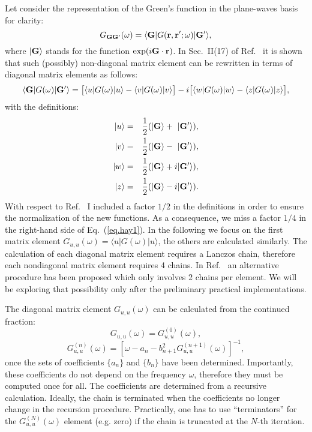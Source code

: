 \documentclass[12pt]{article}
\def\G{{\bf G}}
\def\Gp{{\bf G}^\prime}
\def\r{{\bf r}}
\def\rp{{\bf r}^\prime}
\def\w{\omega}
\begin{document}
\noindent
Let consider the representation of the Green's function in the plane-waves basis
for clarity:
 \begin{equation}
 G_{\G\Gp}(\w) = \langle \G | G(\r,\rp;\w)| \Gp \rangle,
 \end{equation}
where $|\G\rangle$ stands for the function ${\rm exp}(i\G\cdot\r)$.
In Sec.\ II(17) of Ref.\ \cite{haydock.ssp} it is shown that such (possibly) non-diagonal matrix
element can be rewritten in terms of diagonal matrix elements as follows:
 \begin{equation} \label{eq.hay1}
 \langle \G | G(\w)| \Gp \rangle = \big[\langle u | G(\w)| u \rangle - \langle v | G(\w)| v \rangle\big] 
    - i \big[\langle w | G(\w)| w \rangle - \langle z | G(\w)| z \rangle\big],
 \end{equation}
with the definitions:
 \begin{eqnarray}
 |u\rangle &=& \frac{1}{2}(|\G\rangle + \phantom{i}|\Gp\rangle), \\
 |v\rangle &=& \frac{1}{2}(|\G\rangle - \phantom{i}|\Gp\rangle), \\
 |w\rangle &=& \frac{1}{2}(|\G\rangle + i|\Gp\rangle),\\
 |z\rangle &=& \frac{1}{2}(|\G\rangle - i|\Gp\rangle).
 \end{eqnarray}
With respect to Ref.\ \cite{haydock.ssp} I included a factor $1/2$ in the definitions in order to
ensure the normalization of the new functions.
As a consequence, we miss a factor $1/4$ in the right-hand side of Eq.\ (\ref{eq.hay1}).
In the following we focus on the first matrix element $G_{u,u}(\w) = \langle u | G(\w)| u \rangle$, the others are calculated
similarly. The calculation of each diagonal matrix element requires a Lanczos chain, therefore each nondiagonal
matrix element requires 4 chains. In Ref.\ \cite{ballentine} an alternative procedure has been proposed which
only involves 2 chains per element. We will be exploring that possibility only after the preliminary practical 
implementations. 

\noindent
The diagonal matrix element $G_{u,u}(\w)$ can be calculated from the continued fraction:
  \begin{equation}
  G_{u,u}(\w) = G^{(0)}_{u,u}(\w),
  \end{equation}
  \begin{equation}
  G^{(n)}_{u,u}(\w) = [\w - a_n - b_{n+1}^2 G^{(n+1)}_{u,u}(\w)]^{-1},
  \end{equation}
once the sets of coefficients $\{a_n\}$ and $\{b_n\}$ have been determined.
Importantly, these coefficients do not depend on the frequency $\w$, therefore they must be computed once for all.
The coefficients are determined from a recursive calculation. Ideally, the chain is terminated when the coefficients
no longer change in the recursion procedure. Practically, one has to use ``terminators'' for the $G^{(N)}_{u,u}(\w)$
element (e.g. zero) if the chain is truncated at the $N$-th iteration.
\end{document}
